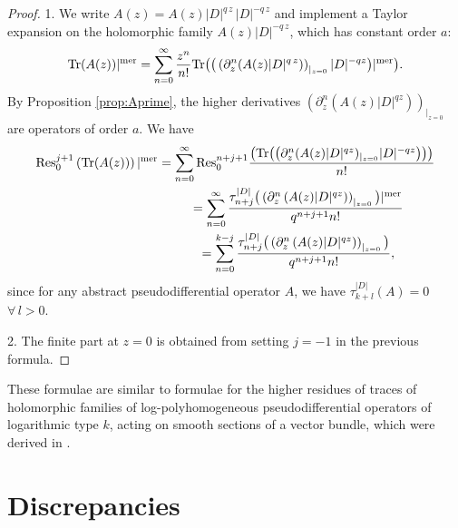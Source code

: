 \begin{proof}
1. We write $A(z)= A(z) \vert D\vert^{q\, z}\, \vert D\vert^{-q\, z}$ and implement
   a Taylor expansion on the holomorphic family $A(z) \vert
   D\vert^{-
q\, z}$, which has constant order $a$:
\[
{\rm Tr}(A(z))\vert^{\rm mer}= \sum_{n=0}^\infty \frac{z^n}{n!}  {\rm Tr}\big(\big(\left(\partial_z^n (A(z)
    \vert D\vert^{q\, z})\right)_{\vert_{z=0}} \vert D\vert^{-q
    z}\big)\vert^{\rm mer}\big).
    \]
By Proposition \ref{prop:Aprime}, the higher derivatives $\left(\partial_z^n
(A(z)  \vert D\vert^{q  z})\right)_{\vert_{z=0}}$ are operators of order $a$. We have
\begin{gather*}
{\rm Res}^{j+1}_{0}\left( {\rm Tr}(A(z))\right)\vert^{\rm mer} =  \sum_{n=0}^\infty {\rm Res}_0^{n+j+1} \frac{
\big( {\rm Tr}\big(\big(\partial_z^n  (A(z)
    \vert D\vert^{q z} )_{\vert_{z=0}}  \vert D\vert^{-q  z}\big)\big)\big)}{n!}\\
    \phantom{{\rm Res}^{j+1}_{0}\left( {\rm Tr}(A(z))\right)\vert^{\rm mer}}{}
 =  \sum_{n=0}^\infty\frac{ \tau^{\vert D\vert}_{n+j}
\big(\left(\partial_z^n \left(A(z) \vert D\vert^{q  z}\right)\right)_{\vert_{z=0}}\big)\vert^{\rm mer}}{q^{n+j+1}  n!}\\
\phantom{{\rm Res}^{j+1}_{0}\left( {\rm Tr}(A(z))\right)\vert^{\rm mer}}{}
 =  \sum_{n=0}^{k-j}\frac{ \tau^{\vert D\vert}_{n+j}\big(\left(\partial_z^n \left(A(z) \vert D\vert^{q  z}\right)\right)_{\vert_{z=0}}\big)}{q^{n+j+1}  n!},
\end{gather*}
since  for any abstract pseudodif\/ferential operator $A$, we have $\tau_{k+l}^{\vert D\vert}(A)=0$ $\forall\, l>0$.

2. The f\/inite part at $z=0$ is obtained from setting $j=-1$ in the
  previous formula.
\end{proof}
\begin{remark} These formulae are similar to formulae for the higher
  residues of traces of holomorphic families of log-polyhomogeneous
  pseudodif\/ferential operators of logarithmic type $k$,   acting on smooth sections of
a vector bundle, which were derived in \cite{L}.
\end{remark}


\section{Discrepancies}\label{section6}
